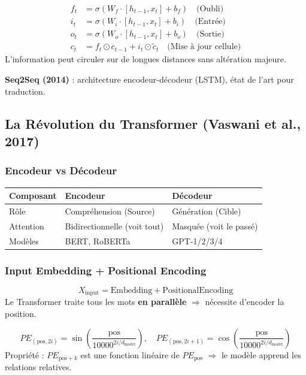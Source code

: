 \documentclass[a4paper,10pt]{article}
\begin{document}
\begin{formulebox}
\begin{align*}
f_t &= \sigma(W_f \cdot [h_{t-1}, x_t] + b_f) \quad \text{(Oubli)}\\
i_t &= \sigma(W_i \cdot [h_{t-1}, x_t] + b_i) \quad \text{(Entrée)}\\
o_t &= \sigma(W_o \cdot [h_{t-1}, x_t] + b_o) \quad \text{(Sortie)}\\
c_t &= f_t \odot c_{t-1} + i_t \odot \tilde{c}_t \quad \text{(Mise à jour cellule)}
\end{align*}
L'information peut circuler sur de longues distances sans altération majeure.
\end{formulebox}

\textbf{Seq2Seq (2014)} : architecture encodeur-décodeur (LSTM), état de l'art pour traduction.

\subsection{La Révolution du Transformer (Vaswani et al., 2017)}

\subsubsection{Encodeur vs Décodeur}
\begin{center}
\small
\begin{tabular}{lll}
\toprule
\textbf{Composant} & \textbf{Encodeur} & \textbf{Décodeur} \\
\midrule
Rôle & Compréhension (Source) & Génération (Cible) \\
Attention & Bidirectionnelle (voit tout) & Masquée (voit le passé) \\
Modèles & BERT, RoBERTa & GPT-1/2/3/4 \\
\bottomrule
\end{tabular}
\end{center}

\subsubsection{Input Embedding + Positional Encoding}
\[
X_{\text{input}} = \text{Embedding} + \text{PositionalEncoding}
\]
Le Transformer traite tous les mots \textbf{en parallèle} $\Rightarrow$ nécessite d'encoder la position.

\begin{formulebox}
\[
PE_{(\text{pos}, 2i)} = \sin\!\left(\frac{\text{pos}}{10000^{2i/d_{\text{model}}}}\right), \quad
PE_{(\text{pos}, 2i+1)} = \cos\!\left(\frac{\text{pos}}{10000^{2i/d_{\text{model}}}}\right)
\]
Propriété : $PE_{\text{pos}+k}$ est une fonction linéaire de $PE_{\text{pos}}$ $\Rightarrow$ le modèle apprend les relations relatives.
\end{formulebox}
\end{document}
